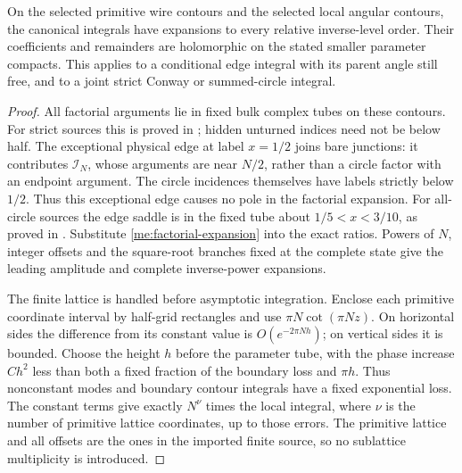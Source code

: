 \begin{lemma}\label{me:local-expansion}
On the selected primitive wire contours and the selected local
angular contours, the canonical integrals have expansions to every
relative inverse-level order. Their coefficients and remainders
are holomorphic on the stated smaller parameter compacts. This
applies to a conditional edge integral with its parent angle still
free, and to a joint strict Conway or summed-circle integral.
\end{lemma}
\begin{proof}
All factorial arguments lie in fixed bulk complex tubes on these
contours. For strict sources this is proved in
\cite[Section 6]{MovingSources}; hidden unturned indices need not
be below half. The exceptional physical edge at label $x=1/2$ joins bare
junctions: it contributes $\mathcal I_N$, whose arguments are near
$N/2$, rather than a circle factor with an endpoint argument.
The circle incidences themselves have labels strictly below $1/2$.
Thus this exceptional edge causes no pole in the factorial expansion.
For all-circle sources the edge saddle is in the
fixed tube about $1/5<x<3/10$, as proved in
\cite[Sections 3 and 7.1]{CircleTree}.
Substitute \eqref{me:factorial-expansion} into the exact ratios.
Powers of $N$, integer offsets and the square-root branches fixed at the complete state give the leading amplitude and complete inverse-power expansions.

The finite lattice is handled before asymptotic integration.
Enclose each primitive coordinate interval by half-grid rectangles
and use $\pi N\cot(\pi Nz)$. On horizontal sides the difference
from its constant value is $O(e^{-2\pi Nh})$; on vertical sides
it is bounded. Choose the height $h$ before the parameter tube,
with the phase increase $C h^2$ less than both a fixed fraction of the
boundary loss and $\pi h$. Thus nonconstant modes and boundary
contour integrals have a fixed exponential loss. The constant terms give
exactly $N^\nu$ times the local integral, where $\nu$ is the number
of primitive lattice coordinates, up to those errors. The
primitive lattice and all offsets are the ones in the imported
finite source, so no sublattice multiplicity is introduced.


\end{proof}

